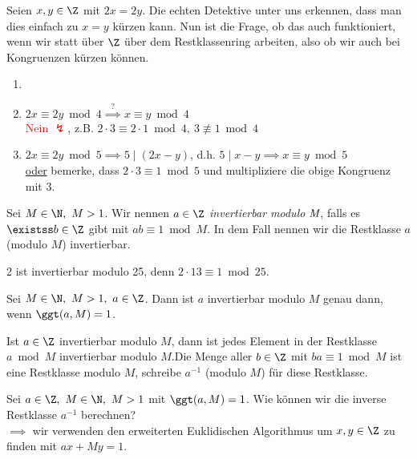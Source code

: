 Seien \( x,y \in \Z \) mit $2x = 2y $. Die echten Detektive unter uns erkennen, dass man dies einfach zu $x = y$ kürzen kann. Nun ist die Frage, ob das auch funktioniert, wenn wir statt über $\Z$ über dem Restklassenring arbeiten, also ob wir auch bei Kongruenzen kürzen können.

\begin{exmp*}
	\begin{enumerate}
		\item[]
		\item \( 2x \equiv 2y \bmod 4 \overset{?}{\implies} x \equiv y \bmod 4 \)\\
			\textcolor{red}{Nein $\lightning$}, z.B. \( 2 \cdot 3 \equiv 2 \cdot 1 \bmod 4,\ 3 \not\equiv 1 \bmod 4 \)
		\item \( 2x \equiv 2y \bmod 5 \implies 5 \mid (2x-y) \), d.h. \( 5 \mid x-y \implies x \equiv y \bmod 5 \)\\
			\underline{oder} bemerke, dass \( 2 \cdot 3 \equiv 1 \bmod 5 \) und multipliziere die obige Kongruenz mit 3.
	\end{enumerate}
\end{exmp*}

\begin{defn*}
	Sei \( M \in \N,\ M > 1 \). Wir nennen \( a \in \Z \) \emph{invertierbar modulo $\emph{M}$}, falls es \( \existss b \in \Z \) gibt mit \( ab \equiv 1 \bmod M \). In dem Fall nennen wir die Restklasse \( a\) (modulo $M$) invertierbar.
\end{defn*}

\begin{exmp*}
	2 ist invertierbar modulo 25, denn \( 2 \cdot 13 \equiv 1 \bmod 25 \).
\end{exmp*}

\begin{thm}\autolabel
	Sei \( M \in \N,\ M > 1,\ a \in \Z \). Dann ist $a$ invertierbar modulo $M$ genau dann, wenn \( \ggt(a,M) = 1 \).
\end{thm}

\begin{rem*}
	Ist \( a \in \Z \) invertierbar modulo $M$, dann ist jedes Element in der Restklasse $a \bmod M$ invertierbar modulo $M$.\video Die Menge aller $b \in \Z$ mit $ba \equiv 1 \bmod M$ ist eine Restklasse modulo $M$, schreibe $a^{-1}$ (modulo $M$) für diese Restklasse.
\end{rem*}

Sei \( a \in \Z,\ M \in \N,\ M > 1 \) mit \( \ggt(a,M) = 1 \). Wie können wir die inverse Restklasse $a^{-1}$ berechnen?\\
$\implies$ wir verwenden den erweiterten Euklidischen Algorithmus um \( x,y \in \Z \) zu finden mit \( ax+My = 1 \).

